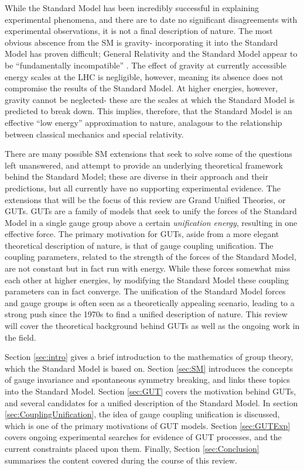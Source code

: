 \documentclass{article}
\begin{document}
While the Standard Model has been incredibly successful in explaining experimental phenomena, and there are to date no significant disagreements with experimental observations, it is not a final description of nature. The most obvious abscence from the SM is gravity- incorporating it into the Standard Model has proven difficult; General Relativity and the Standard Model appear to be ``fundamentally incompatible'' \cite{GRandSM}. The effect of gravity at currently accessible energy scales at the LHC is negligible, however, meaning its absence does not compromise the results of the Standard Model. At higher energies, however, gravity cannot be neglected- these are the scales at which the Standard Model is predicted to break down. This implies, therefore, that the Standard Model is an effective ``low energy'' approximation to nature, analagous to the relationship between classical mechanics and special relativity.

There are many possible SM extensions that seek to solve some of the questions left unanswered, and attempt to provide an underlying theoretical framework behind the Standard Model; these are diverse in their approach and their predictions, but all currently have no supporting experimental evidence. 
The extensions that will be the focus of this review are Grand Unified Theories, or GUTs. GUTs are a family of models that seek to unify the forces of the Standard Model in a single gauge group above a certain \textit{unification energy}, resulting in one effective force. The primary motivation for GUTs, aside from a more elegant theoretical description of nature, is that of gauge coupling unification. The coupling parameters, related to the strength of the forces of the Standard Model, are not constant but in fact run with energy. While these forces somewhat miss each other at higher energies, by modifying the Standard Model these coupling parameters can in fact converge. The unification of the Standard Model forces and gauge groups is often seen as a theoretically appealing scenario, leading to a strong push since the 1970s to find a unified description of nature. This review will cover the theoretical background behind GUTs as well as the ongoing work in the field.

Section \ref{sec:intro} gives a brief introduction to the mathematics of group theory, which the Standard Model is based on. 
Section \ref{sec:SM} introduces the concepts of gauge invariance and spontaneous symmetry breaking, and links these topics into the Standard Model.
Section \ref{sec:GUT} covers the motivation behind GUTs, and several candidates for a unified description of the Standard Model.
In section \ref{sec:CouplingUnification}, the idea of gauge coupling unification is discussed, which is one of the primary motivations of GUT models.
Section \ref{sec:GUTExp} covers ongoing experimental searches for evidence of GUT processes, and the current constraints placed upon them.
Finally, Section \ref{sec:Conclusion} summarises the content covered during the course of this review.
\end{document}
